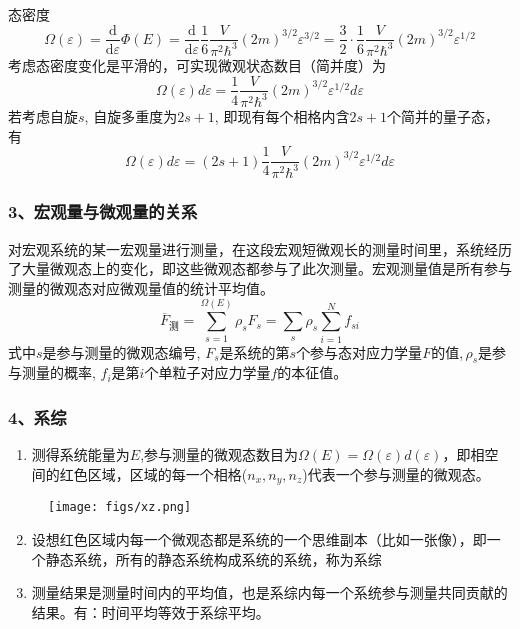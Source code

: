  \begin{frame}
   \frametitle{}
  态密度
  \[  \Omega(\varepsilon) =\frac{\mathrm{d}  }{\mathrm{d}\varepsilon}\Phi(E) = \frac{\mathrm{d}  }{\mathrm{d}\varepsilon} \frac{1}{6} \frac{V}{\pi ^2 \hbar^3} (2m)^{3/2} \varepsilon^{3/2} = \frac{3}{2}\cdot\frac{1}{6} \frac{V}{\pi ^2 \hbar^3} (2m)^{3/2} \varepsilon^{1/2} \]
  考虑态密度变化是平滑的，可实现微观状态数目（简并度）为
  \[\Omega(\varepsilon)  d \varepsilon = \frac{1}{4} \frac{V}{\pi ^2 \hbar^3} (2m)^{3/2} \varepsilon^{1/2} d \varepsilon \]
  若考虑自旋$s$, 自旋多重度为$2s+1$, 即现有每个相格内含$2s+1$个简并的量子态，有
  \[\Omega(\varepsilon)  d \varepsilon = (2s+1)\frac{1}{4} \frac{V}{\pi ^2 \hbar^3} (2m)^{3/2} \varepsilon^{1/2} d \varepsilon \]
 \end{frame} 

 

\begin{frame}
  \frametitle{ 3、宏观量与微观量的关系}
  \emf[参与态表述：]对宏观系统的某一宏观量进行测量，在这段宏观短微观长的测量时间里，系统经历了大量微观态上的变化，即这些微观态都参与了此次测量。宏观测量值是所有参与测量的微观态对应微观量值的统计平均值。
  \[ \overline{F}_{\text{测}} = \sum _{s=1}^{\Omega(E)} \rho _s F_s = \sum _{s} \rho _s \sum _{i=1}^N f_{si} \]
  式中$s$是参与测量的微观态编号, $F_s$是系统的第$s$个参与态对应力学量$F$的值,$\,\rho _s$是参与测量的概率, $f_i$是第$i$个单粒子对应力学量$f$的本征值。
\end{frame} 

\begin{frame}
  \frametitle{ 4、系综}

  \begin{minipage}[b]{0.49\textwidth}
   \begin{enumerate}
     \item 测得系统能量为$E$,参与测量的微观态数目为$\Omega(E) = \Omega(\varepsilon) d (\varepsilon) $，即相空间的红色区域，区域的每一个相格($n_x, n_y, n_z$)代表一个参与测量的微观态。
   \end{enumerate}
   \end{minipage}
   \begin{minipage}[b]{0.49\textwidth}
     \begin{figure}[htbp]
       \centering
       \texttt{[image: figs/xz.png]}
      \end{figure}
     \end{minipage}
     \begin{enumerate}
       \setcounter{enumi}{1}
       \item 设想红色区域内每一个微观态都是系统的一个思维副本（比如一张像），即一个静态系统，所有的静态系统构成系统的系统，称为系综 
       \item 测量结果是测量时间内的平均值，也是系综内每一个系统参与测量共同贡献的结果。有：时间平均等效于系综平均。
     \end{enumerate}
\end{frame} 

